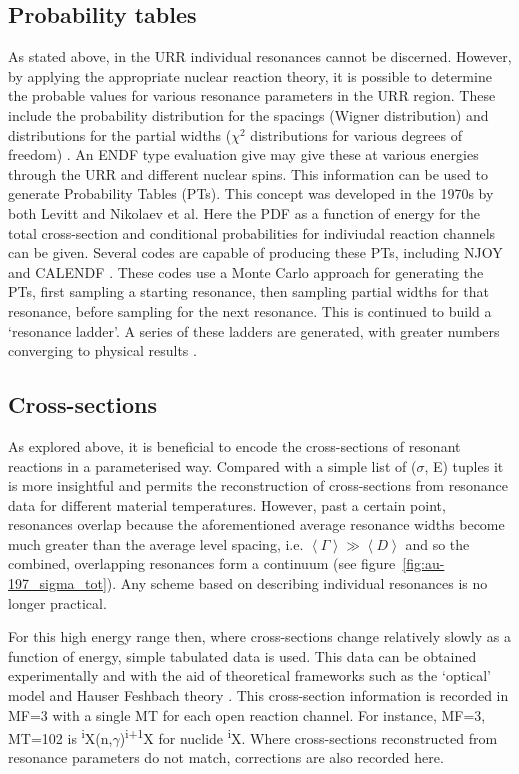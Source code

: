 \subsection{Probability tables}
As stated above, in the URR individual resonances cannot be discerned. However, by applying the appropriate nuclear reaction theory, it is possible to determine the probable values for various resonance parameters in the URR region. These include the probability distribution for the spacings (Wigner distribution) and distributions for the partial widths ($\chi^{2}$ distributions for various degrees of freedom) \cite{MacFarlane2016}. An ENDF type evaluation give may give these at various energies through the URR and different nuclear spins. This information can be used to generate Probability Tables (PTs). This concept was developed in the 1970s by both Levitt and Nikolaev et al. Here the PDF as a function of energy for the total cross-section and conditional probabilities for indiviudal reaction channels can be given. Several codes are capable of producing these PTs, including NJOY \cite{MacFarlane2010} and CALENDF \cite{sublet2017b}. These codes use a Monte Carlo approach for generating the PTs, first sampling a starting resonance, then sampling partial widths for that resonance, before sampling for the next resonance. This is continued to build a `resonance ladder'. A series of these ladders are generated, with greater numbers converging to physical results \cite{Brown2017}. 


\subsection{Cross-sections}
As explored above, it is beneficial to encode the cross-sections of resonant reactions in a parameterised way. Compared with a simple list of ($\sigma$, E) tuples it is more insightful and permits the reconstruction of cross-sections from resonance data for different material temperatures. However, past a certain point, resonances overlap because the aforementioned average resonance widths become much greater than the average level spacing, i.e. $\left<\Gamma\right> \gg \left<D\right>$ and so the combined, overlapping resonances form a continuum (see figure~\ref{fig:au-197_sigma_tot}). Any scheme based on describing individual resonances is no longer practical. 

For this high energy range then, where cross-sections change relatively slowly as a function of energy, simple tabulated data is used. This data can be obtained experimentally and with the aid of theoretical frameworks such as the `optical' model and Hauser Feshbach theory \cite{Hauser1952}. This cross-section information is recorded in MF=3 with a single MT for each open reaction channel. For instance, MF=3, MT=102 is \textsuperscript{i}X(n,$\gamma$)\textsuperscript{i+1}X for nuclide \textsuperscript{i}X. Where cross-sections reconstructed from resonance parameters do not match, corrections are also recorded here.

